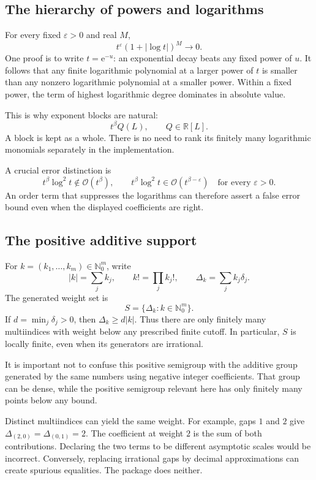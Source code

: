 \documentclass[11pt,a4paper]{article}
\theoremstyle{definition}
\theoremstyle{remark}
\newcommand{\OO}{\mathcal O}
\newcommand{\NN}{\mathbb N_0}
\newcommand{\RR}{\mathbb R}
\newcommand{\ee}{\mathrm e}
\begin{document}
\subsection{The hierarchy of powers and logarithms}

For every fixed $\varepsilon>0$ and real $M$,
\begin{equation}\label{eq:power-beats-log}
 t^\varepsilon(1+|\log t|)^M\longrightarrow0.
\end{equation}
One proof is to write $t=\ee^{-u}$: an exponential decay beats any fixed power
of $u$. It follows that any finite logarithmic polynomial at a larger power of
$t$ is smaller than any nonzero logarithmic polynomial at a smaller power.
Within a fixed power, the term of highest logarithmic degree dominates in
absolute value.

This is why exponent blocks are natural:
\[
 t^\beta Q(L),\qquad Q\in\RR[L].
\]
A block is kept as a whole. There is no need to rank its finitely many
logarithmic monomials separately in the implementation.

A crucial error distinction is
\[
 t^\beta\log^2t\notin\OO(t^\beta),
 \qquad
 t^\beta\log^2t\in\OO(t^{\beta-\varepsilon})
 \quad\text{for every }\varepsilon>0.
\]
An order term that suppresses the logarithms can therefore assert a false
error bound even when the displayed coefficients are right.

\subsection{The positive additive support}

For $k=(k_1,\ldots,k_m)\in\NN^m$, write
\[
 |k|=\sum_j k_j,\qquad k!=\prod_j k_j!,\qquad
 \Delta_k=\sum_j k_j\delta_j.
\]
The generated weight set is
\[
 S=\{\Delta_k:k\in\NN^m\}.
\]
If $d=\min_j\delta_j>0$, then $\Delta_k\ge d|k|$. Thus there are only finitely
many multiindices with weight below any prescribed finite cutoff. In
particular, $S$ is locally finite, even when its generators are irrational.

It is important not to confuse this positive semigroup with the additive
group generated by the same numbers using negative integer coefficients. That
group can be dense, while the positive semigroup relevant here has only
finitely many points below any bound.

Distinct multiindices can yield the same weight. For example, gaps $1$ and $2$
give $\Delta_{(2,0)}=\Delta_{(0,1)}=2$. The coefficient at weight $2$ is the sum
of both contributions. Declaring the two terms to be different asymptotic
scales would be incorrect. Conversely, replacing irrational gaps by decimal
approximations can create spurious equalities. The package does neither.
\end{document}
